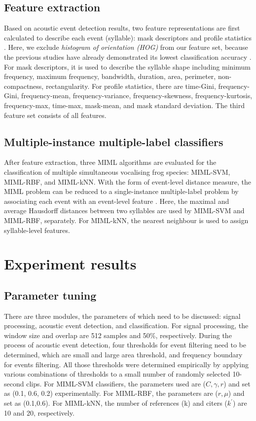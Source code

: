 \subsection{Feature extraction}
Based on acoustic event detection results, two feature representations are first calculated to describe each event (syllable): mask descriptors and profile statistics \citep{briggs2012acoustic}. Here, we exclude \textit{histogram of orientation (HOG)} from our feature set, because the previous studies have already demonstrated its lowest classification accuracy \citep{briggs2012acoustic, ruizmultiple2015}. For mask descriptors, it is used to describe the syllable shape including minimum frequency, maximum frequency, bandwidth, duration, area, perimeter, non-compactness, rectangularity. For profile statistics, there are time-Gini, frequency-Gini, frequency-mean, frequency-variance, frequency-skewness, frequency-kurtosis, frequency-max, time-max, mask-mean, and mask standard deviation. The third feature set consists of all features.







\subsection{Multiple-instance multiple-label classifiers}
After feature extraction, three MIML algorithms are evaluated for the classification of multiple simultaneous vocalising frog species: MIML-SVM, MIML-RBF, and MIML-kNN. With the form of event-level distance measure, the MIML problem can be reduced to a single-instance multiple-label problem by associating each event with an event-level feature \citep{briggs2012acoustic}. Here, the maximal and average Hausdorff distances between two syllables are used by MIML-SVM and MIML-RBF, separately. For MIML-kNN, the nearest neighbour is used to assign syllable-level features. 


\section{Experiment results}

\subsection{Parameter tuning}
There are three modules, the parameters of which need to be discussed: signal processing, acoustic event detection, and classification. For signal processing, the window size and overlap are 512 samples and 50\%, respectively. During the process of acoustic event detection, four thresholds for event filtering need to be determined, which are small and large area threshold, and frequency boundary for events filtering. All those thresholds were determined empirically by applying various combinations of thresholds to a small number of randomly selected 10-second clips. For MIML-SVM classifiers, the parameters used are ($C,\gamma,r$) and set as (0.1, 0.6, 0.2) experimentally. For MIML-RBF, the parameters are ($ r, \mu$) and set as (0.1,0.6). For MIML-kNN, the number of references (k) and citers ($k^{'}$) are 10 and 20, respectively.
 
